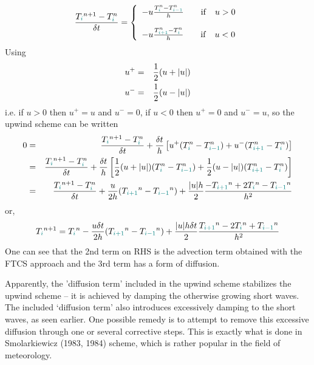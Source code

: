\begin{itemize}
\[
\frac{T_{\color{teal}i}^{n+1}-  T_{{\color{teal}i}}^n   }{\delta t} =
\left\{
\begin{array}{l}
 - u \frac{T^n_{{\color{teal}i}}-T^n_{{\color{teal}i-1}}}{h}  \quad\quad  {\rm if} \quad u>0\\ \\
 - u \frac{T^n_{{\color{teal}i+1}}-T^n_{{\color{teal}i}}}{h}  \quad\quad  {\rm if} \quad u<0
\end{array}
\right.
\]
Using 
\begin{eqnarray}
u^+ &=& \frac12 (u + |u|) \nonumber\\
u^- &=& \frac12 (u - |u|)
\end{eqnarray}
i.e. if $u>0$ then $u^+=u$ and $u^-=0$, if $u<0$ then $u^+=0$ and $u^-=u$,
so the upwind scheme can be written
\begin{eqnarray}
0
&=&
\frac{T_{\color{teal}i}^{n+1}-  T_{{\color{teal}i}}^n   }{\delta t} 
+ \frac{ \delta t}{h}
\left[
u^+ (  T^n_{{\color{teal}i}}-T^n_{{\color{teal}i-1}} )
+u^- ( T^n_{{\color{teal}i+1}}-T^n_{{\color{teal}i}}  )
\right] \nonumber\\
&=&
\frac{T_{\color{teal}i}^{n+1}-  T_{{\color{teal}i}}^n   }{\delta t} 
+ \frac{ \delta t}{h}
\left[
 \frac12 (u + |u|) (  T^n_{{\color{teal}i}}-T^n_{{\color{teal}i-1}} )
+\frac12 (u - |u|) ( T^n_{{\color{teal}i+1}}-T^n_{{\color{teal}i}}  )
\right] \nonumber\\
&=& 
\frac{T_{\color{teal}i}^{n+1}-  T_{{\color{teal}i}}^n   }{\delta t} 
+ \frac{u }{2 h } ( T_{\color{teal}i+1}^n - T_{\color{teal}i-1}^n) 
+ \frac{|u| h}{2}  \frac{ -T_{\color{teal} i+1}^n +  2T_{\color{teal}i}^n  -T_{\color{teal}i-1}^n}{  h^2}
\end{eqnarray}
or,
\[
T_{\color{teal}i}^{n+1} 
= T_{\color{teal}i}^n - \frac{u \delta t}{2 h } ( T_{\color{teal}i+1}^n - T_{\color{teal}i-1}^n) 
+ \frac{|u| h \delta t}{2}
\frac{ T_{\color{teal} i+1}^n -  2T_{\color{teal}i}^n  +T_{\color{teal}i-1}^n}{  h^2}
\]
One can see that the 2nd term on RHS is the advection term obtained with the FTCS approach 
and the 3rd term has a form of diffusion.

Apparently, the 'diffusion term' included in the upwind scheme stabilizes the upwind scheme 
-- it is achieved by damping the otherwise growing short waves.
The included `diffusion term' also introduces excessively damping to the short waves, as seen earlier. One possible
remedy is to attempt to remove this excessive diffusion through one or several corrective steps. This is exactly
what is done in Smolarkiewicz (1983, 1984) scheme, which is rather popular in the field of meteorology.


\end{itemize}
